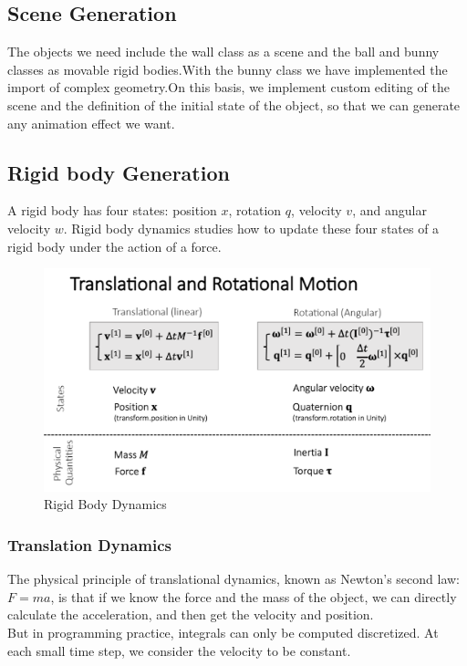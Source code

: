 \documentclass[acmtog]{acmart}
\begin{document}
\subsection{Scene Generation}
The objects we need include the wall class as a scene and the ball and bunny classes as movable rigid bodies.With the bunny class we have implemented the import of complex geometry.On this basis, we implement custom editing of the scene and the definition of the initial state of the object, so that we can generate any animation effect we want.
\subsection{Rigid body Generation}
A rigid body has four states: position $x$, rotation $q$, velocity $v$, and angular velocity $w$. Rigid body dynamics studies how to update these four states of a rigid body under the action of a force.
\begin{figure}[htb]
	\includegraphics[width=\linewidth]{Rigid Body Dynamics.png}
	\caption{Rigid Body Dynamics}
\end{figure}
\subsubsection{Translation Dynamics}
The physical principle of translational dynamics, known as Newton's second law: $F=ma$, is that if we know the force and the mass of the object, we can directly calculate the acceleration, and then get the velocity and position.\\
But in programming practice, integrals can only be computed discretized. At each small time step, we consider the velocity to be constant.
\end{document}
